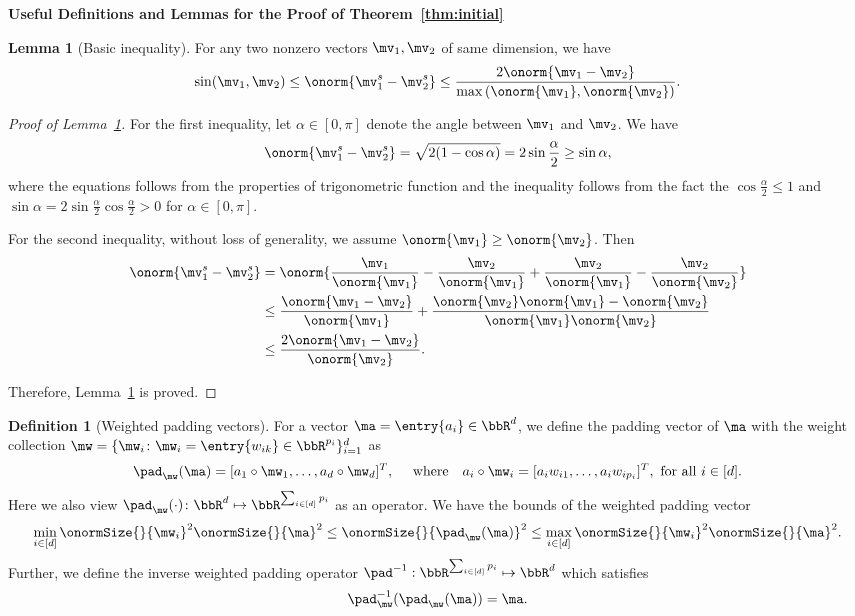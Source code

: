 \documentclass[lettersize,onecolumn,journal]{IEEEtran}
\theoremstyle{definition}
\newtheorem{lem}{Lemma}
\theoremstyle{definition}
\newtheorem{defn}{Definition}
\begin{document}
{\bf Useful Definitions and Lemmas for the Proof of Theorem~\ref{thm:initial}} 
\begin{lem}[Basic inequality]\label{lem:norm_diff} For any two nonzero vectors $\mv_1,\mv_2$ of same dimension, we have 
\[
\sin(\mv_1 , \mv_2) \leq \onorm{{\mv_1^s}-{\mv_2^s}}\leq {2\onorm{\mv_1-\mv_2}\over \max\left(\onorm{\mv_1},\onorm{\mv_2}\right)}.
\]
\end{lem}
\begin{proof}[Proof of Lemma~\ref{lem:norm_diff}]
For the first inequality, let $\alpha \in [0,\pi]$ denote the angle between $\mv_1$ and $\mv_2$. We have 
\begin{align}
     \onorm{{\mv_1^s}-{\mv_2^s}} = \sqrt{2(1 - \cos \alpha)} = 2 \sin \frac{\alpha}{2} \geq \sin \alpha,
\end{align}
where the equations follows from the properties of trigonometric function and the inequality follows from the fact the $\cos \frac{\alpha}{2} \leq 1$ and $\sin \alpha = 2 \sin \frac{\alpha}{2} \cos \frac{\alpha}{2} > 0$ for $\alpha \in [0, \pi]$. 

For the second inequality, without loss of generality, we assume $\onorm{\mv_1}\geq \onorm{\mv_2}$. Then
\begin{align}
\onorm{{\mv_1^s}-{\mv_2^s}}&=\onorm{{\mv_1\over \onorm{\mv_1}}- {\mv_2\over \onorm{\mv_1}}+{\mv_2\over \onorm{\mv_1}}-{\mv_2\over \onorm{\mv_2}}}\\
&\leq {\onorm{\mv_1-\mv_2}\over \onorm{\mv_1}}+{\onorm{\mv_2}\onorm{\mv_1}-\onorm{\mv_2}\over \onorm{\mv_1}\onorm{\mv_2}}\\
&\leq {2\onorm{\mv_1-\mv_2}\over \onorm{\mv_2}}.
\end{align}

Therefore, Lemma~\ref{lem:norm_diff} is proved.
\end{proof}


\begin{defn}[Weighted padding vectors]\label{def:pad} For a vector $\ma = \entry{a_i} \in \bbR^d$, we define the padding vector of $\ma$ with the weight collection $\mw = \{\mw_i\colon \mw_i = \entry{w_{ik}} \in \bbR^{p_i}\}_{i = 1}^d$ as
\begin{equation}\label{eq:paddef}
    \pad_{\mw}(\ma) = [a_1 \circ \mw_1, \ldots, a_d \circ \mw_d]^T, \quad \text{ where} \quad  a_i \circ \mw_i = [a_i w_{i1},\ldots, a_i w_{i p_i}]^T, \text{ for all } i \in [d].
\end{equation}
Here we also view $\pad_{\mw}(\cdot)\colon \bbR^{d}\mapsto \bbR^{\sum_{i\in[d]}p_i}$ as an operator. 
We have the bounds of the weighted padding vector
\begin{equation}\label{eq:pad_bound}
     \min_{i \in [d]} \onormSize{}{\mw_i}^2 \onormSize{}{\ma}^2 \leq \onormSize{}{\pad_{\mw}(\ma)}^2 \leq \max_{i \in [d]} \onormSize{}{\mw_i}^2 \onormSize{}{\ma}^2.
\end{equation}
Further, we define the inverse weighted padding operator $\pad^{-1}: \bbR^{\sum_{i\in[d]}p_i}\mapsto \bbR^d$ which satisfies 
\begin{equation}
    \pad^{-1}_{\mw}(\pad_{\mw}(\ma)) = \ma.
\end{equation}
\end{defn}
\end{document}
